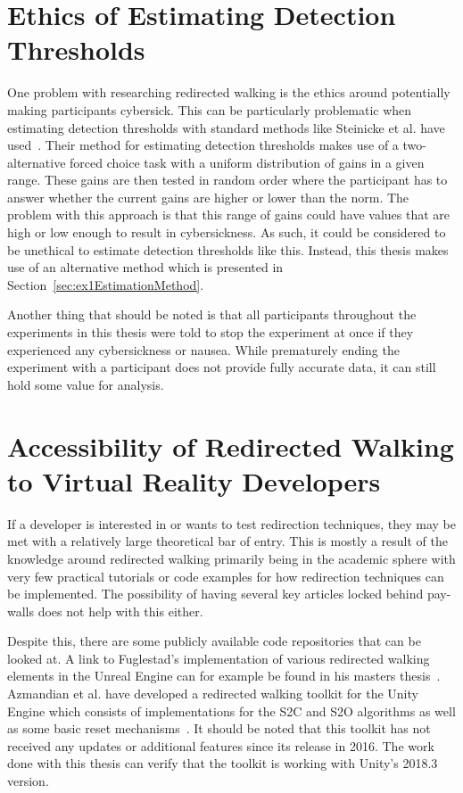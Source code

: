 \section{Ethics of Estimating Detection Thresholds}\label{sec:ethics}
One problem with researching redirected walking is the ethics around potentially making participants cybersick. This can be particularly problematic when estimating detection thresholds with standard methods like Steinicke et al. have used~\cite{5072212}. Their method for estimating detection thresholds makes use of a two-alternative forced choice task with a uniform distribution of gains in a given range. These gains are then tested in random order where the participant has to answer whether the current gains are higher or lower than the norm. The problem with this approach is that this range of gains could have values that are high or low enough to result in cybersickness. As such, it could be considered to be unethical to estimate detection thresholds like this. Instead, this thesis makes use of an alternative method which is presented in Section~\ref{sec:ex1EstimationMethod}.

Another thing that should be noted is that all participants throughout the experiments in this thesis were told to stop the experiment at once if they experienced any cybersickness or nausea. While prematurely ending the experiment with a participant does not provide fully accurate data, it can still hold some value for analysis. 
   
\section{Accessibility of Redirected Walking to Virtual Reality Developers}
If a developer is interested in or wants to test redirection techniques, they may be met with a relatively large theoretical bar of entry. This is mostly a result of the knowledge around redirected walking primarily being in the academic sphere with very few practical tutorials or code examples for how redirection techniques can be implemented. The possibility of having several key articles locked behind pay-walls does not help with this either. 

Despite this, there are some publicly available code repositories that can be looked at. A link to Fuglestad's implementation of various redirected walking elements in the Unreal Engine can for example be found in his masters thesis~\cite{fuglestad2018redirected}. Azmandian et al. have developed a redirected walking toolkit for the Unity Engine which consists of implementations for the S2C and S2O algorithms as well as some basic reset mechanisms~\cite{azmandian2016redirected}. It should be noted that this toolkit has not received any updates or additional features since its release in 2016. The work done with this thesis can verify that the toolkit is working with Unity's 2018.3 version.

